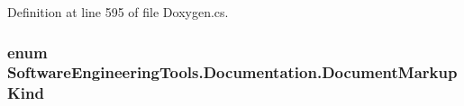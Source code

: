 Definition at line 595 of file Doxygen.\+cs.

\hypertarget{namespace_software_engineering_tools_1_1_documentation_a4eed17ca0ed06a8b62b953b063f857d9}{
\subsubsection[{Document\+Markup\+Kind}]{\setlength{\rightskip}{0pt plus 5cm}enum {\bf Software\+Engineering\+Tools.\+Documentation.\+Document\+Markup\+Kind}}}\label{namespace_software_engineering_tools_1_1_documentation_a4eed17ca0ed06a8b62b953b063f857d9}
